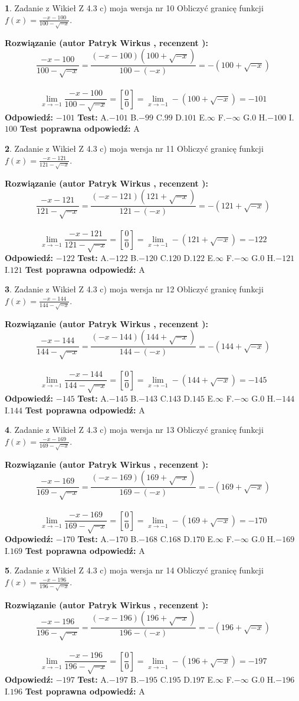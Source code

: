 \documentclass[12pt, a4paper]{article}
\theoremstyle{definition} %
\newtheorem{zad}{}
\newcommand{\zadStart}[1]{\begin{zad}#1\newline}
\newcommand{\zadStop}{\end{zad}}
\newcommand{\rozwStart}[2]{\noindent \textbf{Rozwiązanie (autor #1 , recenzent #2): }\newline}
\newcommand{\rozwStop}{\newline}
\newcommand{\odpStart}{\noindent \textbf{Odpowiedź:}\newline}
\newcommand{\odpStop}{\newline}
\newcommand{\testStart}{\noindent \textbf{Test:}\newline}
\newcommand{\testStop}{\newline}
\newcommand{\kluczStart}{\noindent \textbf{Test poprawna odpowiedź:}\newline}
\newcommand{\kluczStop}{\newline}
\begin{document}
\zadStart{Zadanie z Wikieł Z 4.3 c) moja wersja nr 10}
Obliczyć granicę funkcji $f(x)=\frac{-x-100}{100-\sqrt{-x}}$.
\zadStop
\rozwStart{Patryk Wirkus}{}
$$\frac{-x-100}{100-\sqrt{-x}}=\frac{(-x-100)(100+\sqrt{-x})}{100-(-x)}=-(100+\sqrt{-x})$$
\\
$$\lim\limits_{x\to-1}\frac{-x-100}{100-\sqrt{-x}}=[\frac{0}{0}]=\lim\limits_{x\to-1}-(100+\sqrt{-x}) =-101$$
\rozwStop
\odpStart
$-101$
\odpStop
\testStart
A.$-101$
B.$-99$
C.$99$
D.$101$
E.$\infty$
F.$-\infty$
G.$0$
H.$-100$
I.$100$
\testStop
\kluczStart
A
\kluczStop



\zadStart{Zadanie z Wikieł Z 4.3 c) moja wersja nr 11}
Obliczyć granicę funkcji $f(x)=\frac{-x-121}{121-\sqrt{-x}}$.
\zadStop
\rozwStart{Patryk Wirkus}{}
$$\frac{-x-121}{121-\sqrt{-x}}=\frac{(-x-121)(121+\sqrt{-x})}{121-(-x)}=-(121+\sqrt{-x})$$
\\
$$\lim\limits_{x\to-1}\frac{-x-121}{121-\sqrt{-x}}=[\frac{0}{0}]=\lim\limits_{x\to-1}-(121+\sqrt{-x}) =-122$$
\rozwStop
\odpStart
$-122$
\odpStop
\testStart
A.$-122$
B.$-120$
C.$120$
D.$122$
E.$\infty$
F.$-\infty$
G.$0$
H.$-121$
I.$121$
\testStop
\kluczStart
A
\kluczStop



\zadStart{Zadanie z Wikieł Z 4.3 c) moja wersja nr 12}
Obliczyć granicę funkcji $f(x)=\frac{-x-144}{144-\sqrt{-x}}$.
\zadStop
\rozwStart{Patryk Wirkus}{}
$$\frac{-x-144}{144-\sqrt{-x}}=\frac{(-x-144)(144+\sqrt{-x})}{144-(-x)}=-(144+\sqrt{-x})$$
\\
$$\lim\limits_{x\to-1}\frac{-x-144}{144-\sqrt{-x}}=[\frac{0}{0}]=\lim\limits_{x\to-1}-(144+\sqrt{-x}) =-145$$
\rozwStop
\odpStart
$-145$
\odpStop
\testStart
A.$-145$
B.$-143$
C.$143$
D.$145$
E.$\infty$
F.$-\infty$
G.$0$
H.$-144$
I.$144$
\testStop
\kluczStart
A
\kluczStop



\zadStart{Zadanie z Wikieł Z 4.3 c) moja wersja nr 13}
Obliczyć granicę funkcji $f(x)=\frac{-x-169}{169-\sqrt{-x}}$.
\zadStop
\rozwStart{Patryk Wirkus}{}
$$\frac{-x-169}{169-\sqrt{-x}}=\frac{(-x-169)(169+\sqrt{-x})}{169-(-x)}=-(169+\sqrt{-x})$$
\\
$$\lim\limits_{x\to-1}\frac{-x-169}{169-\sqrt{-x}}=[\frac{0}{0}]=\lim\limits_{x\to-1}-(169+\sqrt{-x}) =-170$$
\rozwStop
\odpStart
$-170$
\odpStop
\testStart
A.$-170$
B.$-168$
C.$168$
D.$170$
E.$\infty$
F.$-\infty$
G.$0$
H.$-169$
I.$169$
\testStop
\kluczStart
A
\kluczStop



\zadStart{Zadanie z Wikieł Z 4.3 c) moja wersja nr 14}
Obliczyć granicę funkcji $f(x)=\frac{-x-196}{196-\sqrt{-x}}$.
\zadStop
\rozwStart{Patryk Wirkus}{}
$$\frac{-x-196}{196-\sqrt{-x}}=\frac{(-x-196)(196+\sqrt{-x})}{196-(-x)}=-(196+\sqrt{-x})$$
\\
$$\lim\limits_{x\to-1}\frac{-x-196}{196-\sqrt{-x}}=[\frac{0}{0}]=\lim\limits_{x\to-1}-(196+\sqrt{-x}) =-197$$
\rozwStop
\odpStart
$-197$
\odpStop
\testStart
A.$-197$
B.$-195$
C.$195$
D.$197$
E.$\infty$
F.$-\infty$
G.$0$
H.$-196$
I.$196$
\testStop
\kluczStart
A
\kluczStop
\end{document}
